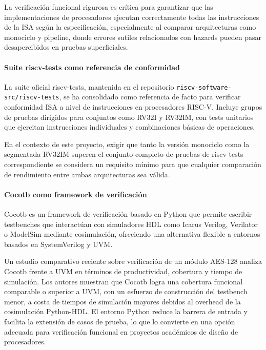 La verificación funcional rigurosa es crítica para garantizar que las
implementaciones de procesadores ejecutan correctamente todas las instrucciones
de la ISA según la especificación, especialmente al comparar arquitecturas
como monociclo y pipeline, donde errores sutiles relacionados con hazards pueden
pasar desapercibidos en pruebas superficiales.


\paragraph{Suite riscv-tests como referencia de conformidad}

La suite oficial riscv-tests, mantenida en el repositorio
\texttt{riscv-software-src/riscv-tests}, se ha consolidado como referencia
de facto para verificar conformidad ISA a nivel de instrucciones en procesadores
RISC-V. Incluye grupos de pruebas dirigidos para conjuntos como RV32I y RV32IM,
con tests unitarios que ejercitan instrucciones individuales y combinaciones
básicas de operaciones.\parencite{RISCVFoundation2019}

En el contexto de este proyecto, exigir que tanto la versión monociclo como la
segmentada RV32IM superen el conjunto completo de pruebas de riscv-tests
correspondiente se considera un requisito mínimo para que cualquier comparación
de rendimiento entre ambas arquitecturas sea válida.\parencite{lowRISC2019}


\paragraph{Cocotb como framework de verificación}

Cocotb es un framework de verificación basado en Python que permite escribir
testbenches que interactúan con simuladores HDL como Icarus Verilog, Verilator
o ModelSim mediante cosimulación, ofreciendo una alternativa flexible a entornos
basados en SystemVerilog y UVM.\parencite{cocotbDocs}

Un estudio comparativo reciente sobre verificación de un módulo AES-128 analiza
Cocotb frente a UVM en términos de productividad, cobertura y tiempo de
simulación. Los autores muestran que Cocotb logra una cobertura funcional
comparable o superior a UVM, con un esfuerzo de construcción del testbench
menor, a costa de tiempos de simulación mayores debidos al overhead de la
cosimulación Python-HDL. El entorno Python reduce la barrera de entrada y
facilita la extensión de casos de prueba, lo que lo convierte en una opción
adecuada para verificación funcional en proyectos académicos de diseño de
procesadores.\parencite{AES2024CocotbUVM}

